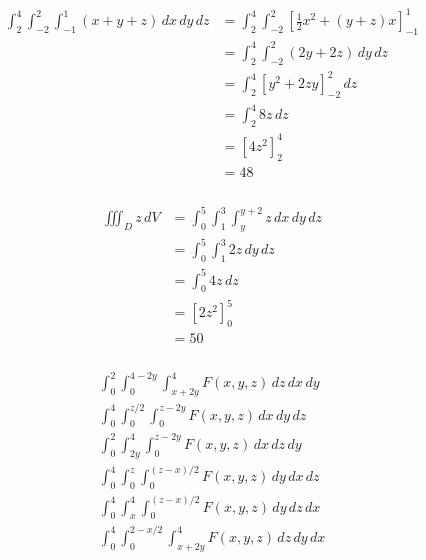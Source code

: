 \documentclass{article}
\begin{document}
\subsubsection{}

\begin{align*}
  \int_2^4 \int_{-2}^2 \int_{-1}^1 (x + y + z) \,dx \,dy \,dz & = \int_2^4 \int_{-2}^2 \left[ \frac{1}{2} x^2 + (y + z) x \right]_{-1}^1 \\
                                                              & = \int_2^4 \int_{-2}^2 (2 y + 2 z) \,dy \,dz                             \\
                                                              & = \int_2^4 [y^2 + 2 z y]_{-2}^2 \,dz                                     \\
                                                              & = \int_2^4 8 z \,dz                                                      \\
                                                              & = [4 z^2]_2^4                                                            \\
                                                              & = 48
\end{align*}

\setcounter{subsubsection}{8}
\subsubsection{}

\begin{align*}
  \iiint_D z \,dV & = \int_0^5 \int_1^3 \int_y^{y + 2} z \,dx \,dy \,dz \\
                  & = \int_0^5 \int_1^3 2 z \,dy \,dz                   \\
                  & = \int_0^5 4 z \,dz                                 \\
                  & = [2 z^2]_0^5                                       \\
                  & = 50
\end{align*}

\setcounter{subsubsection}{10}
\subsubsection{}

\begin{align*}
  \int_0^2 \int_0^{4 - 2 y} \int_{x + 2 y}^4 F(x, y, z) \,dz \,dx \,dy \\
  \int_0^4 \int_0^{z / 2} \int_0^{z - 2 y} F(x, y, z) \,dx \,dy \,dz   \\
  \int_0^2 \int_{2 y}^4 \int_0^{z - 2 y} F(x, y, z) \,dx \,dz \,dy     \\
  \int_0^4 \int_0^z \int_0^{(z - x) / 2} F(x, y, z) \,dy \,dx \,dz     \\
  \int_0^4 \int_x^4 \int_0^{(z - x) / 2} F(x, y, z) \,dy \,dz \,dx     \\
  \int_0^4 \int_0^{2 - x / 2} \int_{x + 2 y}^4 F(x, y, z) \,dz \,dy \,dx
\end{align*}
\end{document}
